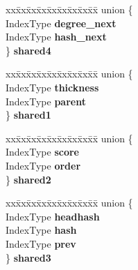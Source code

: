 \begin{DoxyCompactItemize}
\begin{tabbing}
\end{tabbing}\item 
\mbox{\label{structinternal_1_1colamd__col_ad025a7090f74a994765a1b033549ef4b}} 
\begin{tabbing}
xx\=xx\=xx\=xx\=xx\=xx\=xx\=xx\=xx\=\kill
union \{\\
\>IndexType {\bfseries degree\_next}\\
\>IndexType {\bfseries hash\_next}\\
\} {\bfseries shared4}\\

\end{tabbing}\item 
\mbox{\label{structinternal_1_1colamd__col_a11336dc83765cf64c9b700de04c29a88}} 
\begin{tabbing}
xx\=xx\=xx\=xx\=xx\=xx\=xx\=xx\=xx\=\kill
union \{\\
\>IndexType {\bfseries thickness}\\
\>IndexType {\bfseries parent}\\
\} {\bfseries shared1}\\

\end{tabbing}\item 
\mbox{\label{structinternal_1_1colamd__col_ac517e0d2f9e3704ce6f934845ffa41ba}} 
\begin{tabbing}
xx\=xx\=xx\=xx\=xx\=xx\=xx\=xx\=xx\=\kill
union \{\\
\>IndexType {\bfseries score}\\
\>IndexType {\bfseries order}\\
\} {\bfseries shared2}\\

\end{tabbing}\item 
\mbox{\label{structinternal_1_1colamd__col_a28139e4eed26d628548d49684166b555}} 
\begin{tabbing}
xx\=xx\=xx\=xx\=xx\=xx\=xx\=xx\=xx\=\kill
union \{\\
\>IndexType {\bfseries headhash}\\
\>IndexType {\bfseries hash}\\
\>IndexType {\bfseries prev}\\
\} {\bfseries shared3}\\


\end{tabbing}
\end{DoxyCompactItemize}
